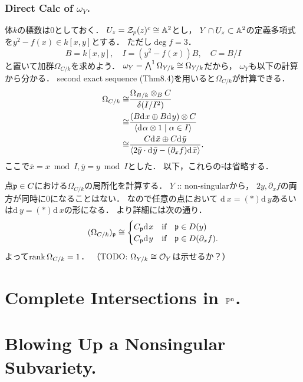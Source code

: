\documentclass[a4paper]{jsarticle}
\newcommand{\der}[1][\!]{\mathrm{d}_{#1}\,}
\newcommand{\Der}{\Omega}
\newcommand{\shCano}{\omega}
\begin{document}
    \subsubsection{Direct Calc of $\shCano_Y$.}
    体$k$の標数は$0$としておく．
    $U_z=\mathcal{Z}_p(z)^c \cong \mathbb{A}^2$とし，
    $Y \cap U_z \subset \mathbb{A}^2$の定義多項式を$y^2-f(x) \in k[x,y]$とする．
    ただし$\deg f=3$．
    \[ B=k[x,y], \quad I=(y^2-f(x))B, \quad C=B/I \]
    と置いて加群$\Der_{C/k}$を求めよう．
    $\shCano_Y=\bigwedge^1 \Der_{Y/k} \iso \Der_{Y/k}$だから，
    $\shCano_Y$も以下の計算から分かる．
    second exact sequence (Thm8.4)を用いると$\Der_{C/k}$が計算できる．
    \begin{align*}
                \Der_{C/k}
        \iso&   \frac{\Der_{B/k} \otimes_B C}{\delta(I/I^2)} \\
        \iso&   \frac{(B \der x \oplus B \der y) \otimes C}
                {\langle \der \alpha \otimes 1 \mid \alpha \in I \rangle} \\
        \iso&   \frac{C \der \bar{x} \oplus C \der \bar{y}}
                {\langle 2 \bar{y} \cdot \der \bar{y} -(\partial_x f) \der \bar{x} \rangle}.
    \end{align*}
    ここで$\bar{x}=x \bmod I, \bar{y}=y \bmod I$とした．
    以下，これらの$\bar{\square}$は省略する．
    
    点$\mathfrak{p} \in C$における$\Der_{C/k}$の局所化を計算する．
    $Y$ :: non-singularから，
    $2y, \partial_x f$の両方が同時に$0$になることはない．
    なので任意の点において
    $\der x=(*) \der y$あるいは$\der y=(*) \der x$の形になる．
    より詳細には次の通り．
    \[
        (\Der_{C/k})_{\I{p}} \iso
        \begin{cases}{}
            C_{\I{p}} \der x & \text{if} \quad \I{p} \in D(y) \\
            C_{\I{p}} \der y & \text{if} \quad \I{p} \in D(\partial_x f). \\
        \end{cases}
    \]
    よって$\rank \Der_{C/k}=1$．
    （TODO: $\Der_{Y/k} \iso \shO_Y$は示せるか？）

\section{Complete Intersections in $\mathbb{P}^n$.} %

\section{Blowing Up a Nonsingular Subvariety.} %
\end{document}

